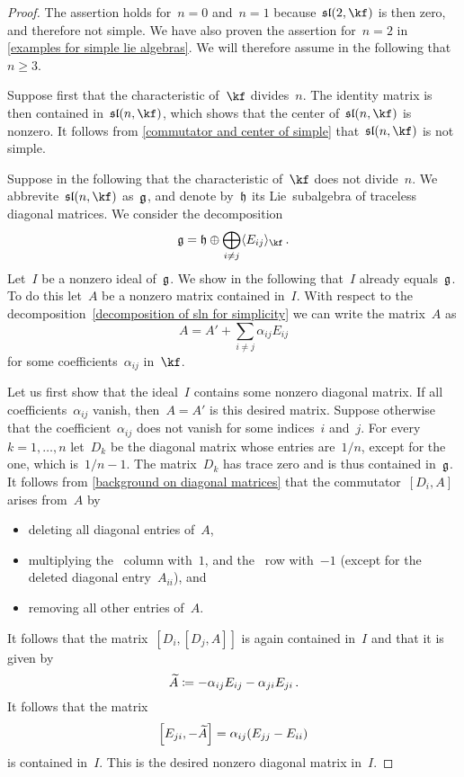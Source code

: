 \begin{proof}
	The assertion holds for~$n = 0$ and~$n = 1$ because~$\sllie(2, \kf)$ is then zero, and therefore not simple.
	We have also proven the assertion for~$n = 2$ in \cref{examples for simple lie algebras}.
	We will therefore assume in the following that~$n \geq 3$.

	Suppose first that the characteristic of~$\kf$ divides~$n$.
	The identity matrix is then contained in~$\sllie(n, \kf)$, which shows that the center of~$\sllie(n, \kf)$ is nonzero.
	It follows from \cref{commutator and center of simple} that~$\sllie(n, \kf)$ is not simple.

	Suppose in the following that the characteristic of~$\kf$ does not divide~$n$.
	We abbrevite~$\sllie(n, \kf)$ as~$\mathfrak{g}$, and denote by~$\mathfrak{h}$ its Lie~subalgebra of traceless diagonal matrices.
	We consider the decomposition
	\begin{equation}
		\label{decomposition of sln for simplicity}
		\glie
		=
		\hlie \oplus \bigoplus_{i \neq j} \gen{ E_{ij} }_{\kf} \,.
	\end{equation}
	Let~$I$ be a nonzero ideal of~$\mathfrak{g}$.
	We show in the following that~$I$ already equals~$\mathfrak{g}$.
	To do this let~$A$ be a nonzero matrix contained in~$I$.
	With respect to the decomposition~\eqref{decomposition of sln for simplicity} we can write the matrix~$A$ as
	\[
		A = A' + \sum_{i \neq j} \alpha_{ij} E_{ij}
	\]
	for some coefficients~$\alpha_{ij}$ in~$\kf$.

	Let us first show that the ideal~$I$ contains some nonzero diagonal matrix.
	If all coefficients~$\alpha_{ij}$ vanish, then~$A = A'$ is this desired matrix.
	Suppose otherwise that the coefficient~$\alpha_{ij}$ does not vanish for some indices~$i$ and~$j$.
	For every~$k = 1, \dotsc, n$ let~$D_k$ be the diagonal matrix whose entries are~$1/n$, except for the~ one, which is~$1/n - 1$.
	The matrix~$D_k$ has trace zero and is thus contained in~$\mathfrak{g}$.
	It follows from \cref{background on diagonal matrices} that the commutator~$[D_i, A]$ arises from~$A$ by
	\begin{itemize}
		\item
			deleting all diagonal entries of~$A$,
		\item
			multiplying the~ column with~$1$, and the~ row with~$-1$ (except for the deleted diagonal entry~$A_{ii}$), and
		\item
		  removing all other entries of~$A$.
	\end{itemize}
	It follows that the matrix~$[D_i, [D_j, A]]$ is again contained in~$I$ and that it is given by
	\[
		\widetilde{A}
		\coloneqq
		- \alpha_{ij} E_{ij} - \alpha_{ji} E_{ji} \,.
	\]
	It follows that the matrix
	\[
		\Bigl[ E_{ji}, - \widetilde{A} \Bigr]
		=
		\alpha_{ij} ( E_{jj} - E_{ii} )
	\]
	is contained in~$I$.
	This is the desired nonzero diagonal matrix in~$I$.


\end{proof}

